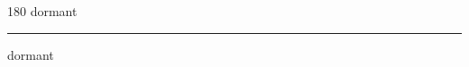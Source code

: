 
\begin{frame}
\begin{center}
\begin{turn}{180}
{\fontsize{2.5cm}{1em}\selectfont dormant}
\end{turn}
\vspace{1em}\par  
\hrule
\vspace{1em}\par  
{\fontsize{2.5cm}{1em}\selectfont dormant}
\end{center}
\end{frame}
